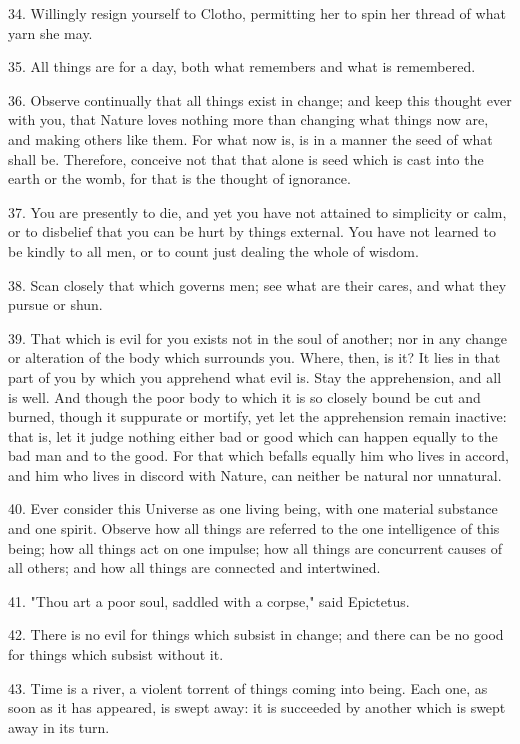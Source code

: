 \documentclass{book}
\begin{document}
34. Willingly resign yourself to Clotho, permitting her to spin her
thread of what yarn she may.

35. All things are for a day, both what remembers and what is
remembered.

36. Observe continually that all things exist in change; and keep this
thought ever with you, that Nature loves nothing more than changing
what things now are, and making others like them. For what now is, is
in a manner the seed of what shall be. Therefore, conceive not that
that alone is seed which is cast into the earth or the womb, for that
is the thought of ignorance.

37. You are presently to die, and yet you have not attained to
simplicity or calm, or to disbelief that you can be hurt by things
external. You have not learned to be kindly to all men, or to count
just dealing the whole of wisdom.

38. Scan closely that which governs men; see what are their cares, and
what they pursue or shun.

39. That which is evil for you exists not in the soul of another; nor
in any change or alteration of the body which surrounds you. Where,
then, is it? It lies in that part of you by which you apprehend what
evil is. Stay the apprehension, and all is well. And though the poor
body to which it is so closely bound be cut and burned, though it
suppurate or mortify, yet let the apprehension remain inactive: that
is, let it judge nothing either bad or good which can happen equally
to the bad man and to the good. For that which befalls equally him who
lives in accord, and him who lives in discord with Nature, can neither
be natural nor unnatural.

40. Ever consider this Universe as one living being, with one material
substance and one spirit. Observe how all things are referred to the
one intelligence of this being; how all things act on one impulse; how
all things are concurrent causes of all others; and how all things are
connected and intertwined.

41. "Thou art a poor soul, saddled with a corpse," said Epictetus.

42. There is no evil for things which subsist in change; and there can
be no good for things which subsist without it.

43. Time is a river, a violent torrent of things coming into
being. Each one, as soon as it has appeared, is swept away: it is
succeeded by another which is swept away in its turn.
\end{document}
